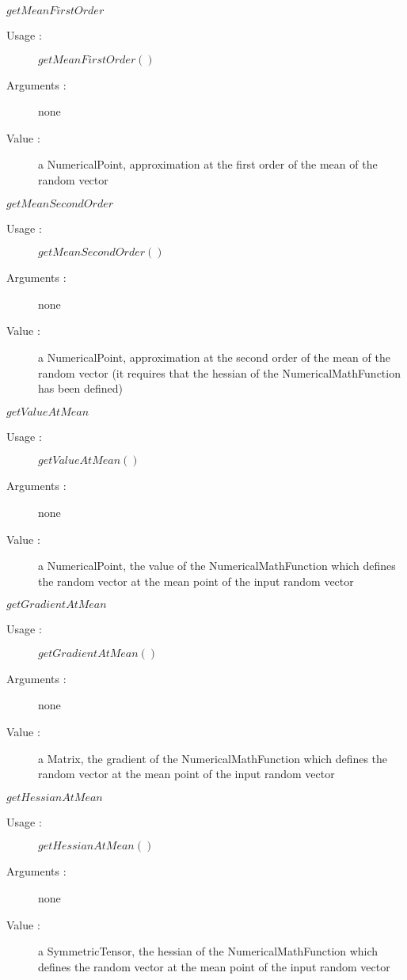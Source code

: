 \begin{description}
\begin{description}
    \bigskip
  \item $getMeanFirstOrder$
    \begin{description}
    \item[Usage :] $getMeanFirstOrder()$
    \item[Arguments :] none
    \item[Value :] a NumericalPoint, approximation at the first order of the mean of the random vector
    \end{description}
    \bigskip


  \item $getMeanSecondOrder$
    \begin{description}
    \item[Usage :] $getMeanSecondOrder()$
    \item[Arguments :] none
    \item[Value :] a NumericalPoint, approximation at the second order of the mean of the random vector (it requires that the hessian of the NumericalMathFunction has been defined)
    \end{description}
    \bigskip

  \item $getValueAtMean$
    \begin{description}
    \item[Usage :] $getValueAtMean()$
    \item[Arguments :] none
    \item[Value :] a NumericalPoint, the value of the NumericalMathFunction which defines the random vector at the mean point of the input random vector
    \end{description}
    \bigskip

  \item $getGradientAtMean$
    \begin{description}
    \item[Usage :] $getGradientAtMean()$
    \item[Arguments :] none
    \item[Value :] a Matrix, the gradient of the NumericalMathFunction which defines the random vector at the mean point of the input random vector
    \end{description}
    \bigskip

  \item $getHessianAtMean$
    \begin{description}
    \item[Usage :] $getHessianAtMean()$
    \item[Arguments :] none
    \item[Value :] a SymmetricTensor, the hessian of the NumericalMathFunction which defines the random vector at the mean point of the input random vector
    \end{description}

  \end{description}

\end{description}


